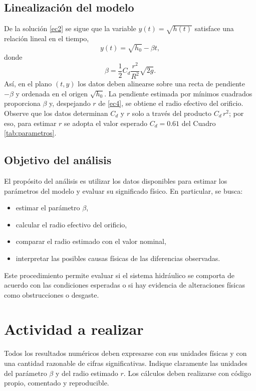 \documentclass[oneside,letter,spanish,activeacute,english,links,10pt]{amcaGCS_EDO}
\begin{document}
\subsection{Linealización del modelo}
De la solución \eqref{ec2} se sigue que la variable $y(t)=\sqrt{h(t)}$ satisface una relación lineal en el tiempo,
\begin{equation}\label{ec3}
	y(t)=\sqrt{h_0}-\beta t ,
\end{equation}
donde
\begin{equation}\label{ec4}
	\beta=\frac{1}{2} C_d \frac{r^2}{R^2} \sqrt{2 g}.
\end{equation}
Así, en el plano $(t,y)$ los datos deben alinearse sobre una recta de pendiente $-\beta$ y ordenada en el origen $\sqrt{h_0}$. La pendiente estimada por mínimos cuadrados proporciona $\beta$ y, despejando $r$ de \eqref{ec4}, se obtiene el radio efectivo del orificio. Observe que los datos determinan $C_d$ y $r$ solo a través del producto $C_d\,r^2$; por eso, para estimar $r$ se adopta el valor esperado $C_d=0.61$ del Cuadro \ref{tab:parametros}.

\subsection{Objetivo del análisis}
El propósito del análisis es utilizar los datos disponibles para estimar los parámetros del modelo y evaluar su significado físico. En particular, se busca:
\begin{itemize}
	\item estimar el parámetro $\beta$,
	\item calcular el radio efectivo del orificio,
	\item comparar el radio estimado con el valor nominal,
	\item interpretar las posibles causas físicas de las diferencias observadas.
\end{itemize}
Este procedimiento permite evaluar si el sistema hidráulico se comporta de acuerdo con las condiciones esperadas o si hay evidencia de alteraciones físicas como obstrucciones o desgaste.

\section{Actividad a realizar}
Todos los resultados numéricos deben expresarse con sus unidades físicas y con una cantidad razonable de cifras significativas. Indique claramente las unidades del parámetro $\beta$ y del radio estimado $r$. Los cálculos deben realizarse con código propio, comentado y reproducible.
\end{document}
